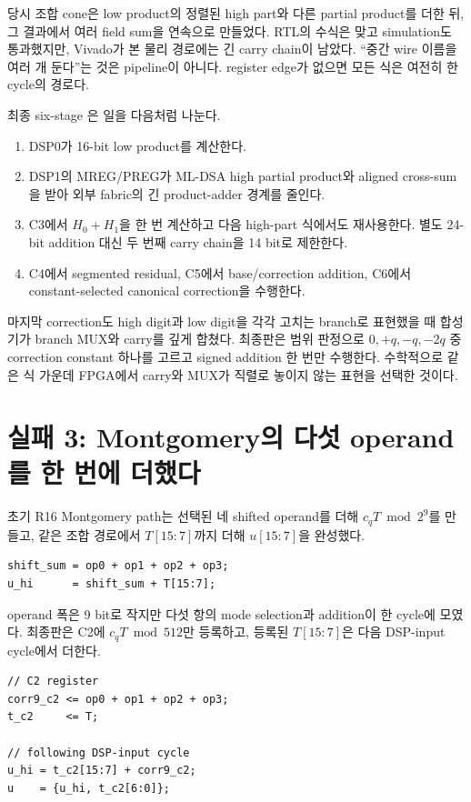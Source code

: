 당시 조합 cone은 low product의 정렬된 high part와 다른 partial product를
더한 뒤, 그 결과에서 여러 field sum을 연속으로 만들었다. RTL의 수식은 맞고
simulation도 통과했지만, Vivado가 본 물리 경로에는 긴 carry chain이 남았다.
“중간 wire 이름을 여러 개 둔다”는 것은 pipeline이 아니다. register edge가
없으면 모든 식은 여전히 한 cycle의 경로다.

최종 six-stage 은 일을 다음처럼 나눈다.

\begin{enumerate}
  \item DSP0가 16-bit low product를 계산한다.
  \item DSP1의 MREG/PREG가 ML-DSA high partial product와 aligned cross-sum을
        받아 외부 fabric의 긴 product-adder 경계를 줄인다.
  \item C3에서 $H_0+H_1$을 한 번 계산하고 다음 high-part 식에서도 재사용한다.
        별도 24-bit addition 대신 두 번째 carry chain을 14 bit로 제한한다.
  \item C4에서 segmented residual, C5에서 base/correction addition,
        C6에서 constant-selected canonical correction을 수행한다.
\end{enumerate}

마지막 correction도 high digit과 low digit을 각각 고치는 branch로 표현했을 때
합성기가 branch MUX와 carry를 깊게 합쳤다. 최종판은 범위 판정으로
$0,+q,-q,-2q$ 중 correction constant 하나를 고르고 signed addition 한 번만
수행한다. 수학적으로 같은 식 가운데 FPGA에서 carry와 MUX가 직렬로 놓이지
않는 표현을 선택한 것이다.

\section{실패 3: Montgomery의 다섯 operand를 한 번에 더했다}

초기 R16 Montgomery path는 선택된 네 shifted operand를 더해
$c_qT\bmod 2^9$를 만들고, 같은 조합 경로에서 $T[15:7]$까지 더해
$u[15:7]$을 완성했다.

\begin{lstlisting}
shift_sum = op0 + op1 + op2 + op3;
u_hi      = shift_sum + T[15:7];
\end{lstlisting}

operand 폭은 9 bit로 작지만 다섯 항의 mode selection과 addition이 한 cycle에
모였다. 최종판은 C2에 $c_qT\bmod512$만 등록하고, 등록된 $T[15:7]$은 다음
DSP-input cycle에서 더한다.

\begin{lstlisting}
// C2 register
corr9_c2 <= op0 + op1 + op2 + op3;
t_c2     <= T;

// following DSP-input cycle
u_hi = t_c2[15:7] + corr9_c2;
u    = {u_hi, t_c2[6:0]};
\end{lstlisting}

